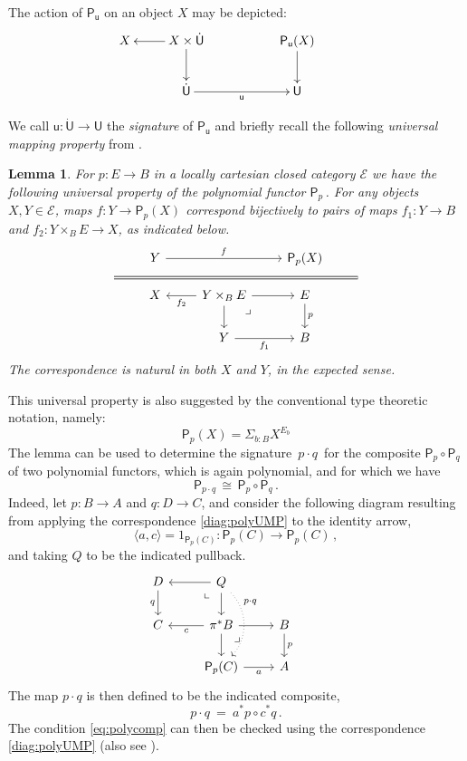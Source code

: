 \documentclass[12pt,reqno]{amsart}
\newcommand{\EE}{\ensuremath{\mathcal{E}}}
\newcommand{\alg}[1]{\ensuremath{\mathsf{#1}}}
\renewcommand{\to}{\ensuremath{\rightarrow}}
\renewcommand{\t}{\ensuremath{\mathsf{u}}}
\newcommand{\T}{\ensuremath{\mathsf{U}}}
\newcommand{\TT}{\ensuremath{\dot{\mathsf{U}}}}
\newcommand{\tT}{\ensuremath{{\t}:\TT\to\T}}
\newcommand{\pbcorner}{\arrow[dr,phantom,"\lrcorner" very near start, shift right=.5ex]} %
\newcommand{\pbcornerright}{\arrow[dl,phantom,"\llcorner" very near start, shift left=.5ex]} %
\newtheorem{lemma}[theorem]{Lemma}
\theoremstyle{remark}
\theoremstyle{definition}
\begin{document}
The action of $\alg{P}_\t$ on an object $X$ may be depicted:
\begin{equation*}
\xymatrix{
 X & \ar[l] X\times \TT \ar[d] && \alg{P}_\t(X) \ar[d] \\
	& \TT \ar[rr]_{\t} && \T 
 }\qquad\quad
 \end{equation*}

We call $\tT$ the \emph{signature} of $\alg{P}_\t$ and briefly recall the following \emph{universal mapping property} from \cite{awodey:NM}.

\begin{lemma}
 For $p: E \to B$ in a locally cartesian closed category $\EE$ we have the following universal property of the polynomial functor $\alg{P}_p$\,. For any objects $X, Y \in \EE$, maps $f : Y \to \alg{P}_p (X)$ correspond bijectively to pairs of maps $f_1 : Y \to B$ and $f_2 : Y\times_B E \to X$, as indicated below.
\begin{equation}\label{diag:polyUMP}
\begin{tikzcd}
& Y \ar[rr,"f"] && \alg{P}_p (X) & \\[-5ex]
\strut \ar[rrrr, equal] &&&& \strut\\[-5ex]
&X & \ar[l,"f_2"] Y\times_B E \ar[d] \ar[r] \pbcorner & E \ar[d, "p"] &\\
&& Y \ar[r,swap,"f_1"] & B &
\end{tikzcd}
\end{equation}
The correspondence is natural in both $X$ and $Y$, in the expected sense.
\end{lemma}

This universal property is also suggested by the conventional type theoretic notation, namely: $$\alg{P}_p (X) = \Sigma_{b:B} X^{E_b}$$
The lemma can be used to determine the signature $\, p\cdot q\, $ for the composite $\alg{P}_p \circ \alg{P}_q$ of two polynomial functors, which is again polynomial, and for which we have
\begin{equation}\label{eq:polycomp}
\alg{P}_{p\cdot q}\, \cong\, \alg{P}_p \circ \alg{P}_q\,.
\end{equation}
Indeed, let $p : B \to A$ and $q : D \to C$, and consider the following diagram resulting from applying the correspondence \eqref{diag:polyUMP} to the identity arrow,
\[
\langle a, c\rangle = 1_{\alg{P}_p(C)} : \alg{P}_p(C) \to \alg{P}_p(C)\,,
\]
and taking $Q$ to be the indicated pullback.
%
\begin{equation}\label{diag:polyUMP2}
\begin{tikzcd}
D \ar[d,swap,"q"] & \ar[l] Q \ar[d] \pbcornerright  \ar[dd, dotted, bend left = 10ex ,near start, "{p\cdot q}"]& & \\
 C  & \ar[l,"c"] \pi^*B \ar[d] \ar[r] \pbcorner & B \ar[d,"p"] \\
&  \alg{P}_p(C) \ar[r,swap,"a"] & A
\end{tikzcd}
\end{equation}
The map $p\cdot q$ is then defined to be the indicated composite,
\[
p\cdot q\ =\ a^*p \circ c^*q\,.
\]
The condition \eqref{eq:polycomp} can then be checked using the correspondence \eqref{diag:polyUMP} (also see \cite{GambinoKoch:2013}).
\end{document}
